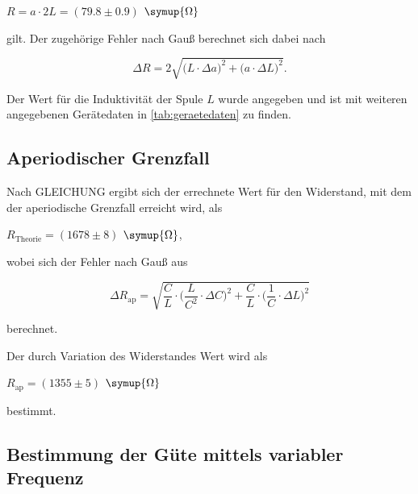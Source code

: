 \begin{center}
    $R = a \cdot 2L = (79.8 \pm 0.9)$ $\symup{\Omega}$
\end{center}

gilt. Der zugehörige Fehler nach Gauß berechnet sich dabei nach

\begin{equation}
    \Delta R = 2 \sqrt{ \bigg( L \cdot \Delta a \bigg)^2 + \bigg( a \cdot \Delta L \bigg)^2 }.
\end{equation}

Der Wert für die Induktivität der Spule $L$ wurde angegeben und ist mit weiteren angegebenen Gerätedaten in \autoref{tab:geraetedaten} zu finden.



\subsection{Aperiodischer Grenzfall}

Nach GLEICHUNG ergibt sich der errechnete Wert für den Widerstand, mit dem der aperiodische Grenzfall erreicht wird, als

\begin{center}
    $R_\text{Theorie} = (1678 \pm 8)$ $\symup{\Omega}$,
\end{center}

wobei sich der Fehler nach Gauß aus %

\begin{equation}
    \Delta R_\text{ap} = \sqrt{ \frac{C}{L} \cdot \bigg( \frac{L}{C^2} \cdot \Delta C \bigg)^2 + \frac{C}{L} \cdot \bigg( \frac{1}{C} \cdot \Delta L \bigg)^2 }
\end{equation}

berechnet.

Der durch Variation des Widerstandes Wert wird als

\begin{center}
    $R_\text{ap} = (1355 \pm 5)$ $\symup{\Omega}$
\end{center}

bestimmt.

\subsection{Bestimmung der Güte mittels variabler Frequenz}

